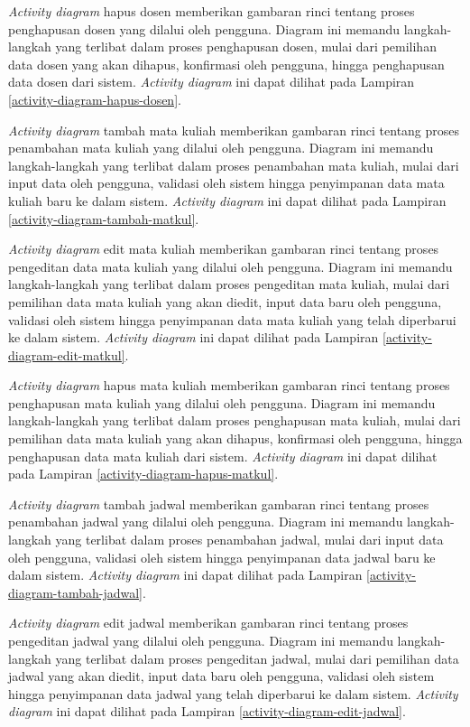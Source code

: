 \textit{Activity diagram} hapus dosen memberikan gambaran rinci tentang proses penghapusan dosen yang dilalui oleh pengguna. Diagram ini memandu langkah-langkah yang terlibat dalam proses penghapusan dosen, mulai dari pemilihan data dosen yang akan dihapus, konfirmasi oleh pengguna, hingga penghapusan data dosen dari sistem. \textit{Activity diagram} ini dapat dilihat pada Lampiran \ref{activity-diagram-hapus-dosen}.


\textit{Activity diagram} tambah mata kuliah memberikan gambaran rinci tentang proses penambahan mata kuliah yang dilalui oleh pengguna. Diagram ini memandu langkah-langkah yang terlibat dalam proses penambahan mata kuliah, mulai dari input data oleh pengguna, validasi oleh sistem hingga penyimpanan data mata kuliah baru ke dalam sistem. \textit{Activity diagram} ini dapat dilihat pada Lampiran \ref{activity-diagram-tambah-matkul}.


\textit{Activity diagram} edit mata kuliah memberikan gambaran rinci tentang proses pengeditan data mata kuliah yang dilalui oleh pengguna. Diagram ini memandu langkah-langkah yang terlibat dalam proses pengeditan mata kuliah, mulai dari pemilihan data mata kuliah yang akan diedit, input data baru oleh pengguna, validasi oleh sistem hingga penyimpanan data mata kuliah yang telah diperbarui ke dalam sistem. \textit{Activity diagram} ini dapat dilihat pada Lampiran \ref{activity-diagram-edit-matkul}.


\textit{Activity diagram} hapus mata kuliah memberikan gambaran rinci tentang proses penghapusan mata kuliah yang dilalui oleh pengguna. Diagram ini memandu langkah-langkah yang terlibat dalam proses penghapusan mata kuliah, mulai dari pemilihan data mata kuliah yang akan dihapus, konfirmasi oleh pengguna, hingga penghapusan data mata kuliah dari sistem. \textit{Activity diagram} ini dapat dilihat pada Lampiran \ref{activity-diagram-hapus-matkul}.


\textit{Activity diagram} tambah jadwal memberikan gambaran rinci tentang proses penambahan jadwal yang dilalui oleh pengguna. Diagram ini memandu langkah-langkah yang terlibat dalam proses penambahan jadwal, mulai dari input data oleh pengguna, validasi oleh sistem hingga penyimpanan data jadwal baru ke dalam sistem. \textit{Activity diagram} ini dapat dilihat pada Lampiran \ref{activity-diagram-tambah-jadwal}.


\textit{Activity diagram} edit jadwal memberikan gambaran rinci tentang proses pengeditan jadwal yang dilalui oleh pengguna. Diagram ini memandu langkah-langkah yang terlibat dalam proses pengeditan jadwal, mulai dari pemilihan data jadwal yang akan diedit, input data baru oleh pengguna, validasi oleh sistem hingga penyimpanan data jadwal yang telah diperbarui ke dalam sistem. \textit{Activity diagram} ini dapat dilihat pada Lampiran \ref{activity-diagram-edit-jadwal}.


